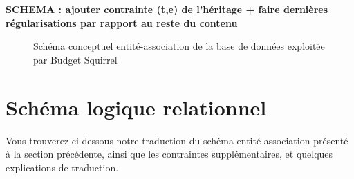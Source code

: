\documentclass[a4paper,12pt]{article}
\begin{document}
\textbf{SCHEMA : ajouter contrainte (t,e) de l'héritage + faire dernières régularisations par rapport au reste du contenu}

\begin{figure}[!ht]
\noindent
{}
\caption{\footnotesize{Schéma conceptuel entité-association de la base de données exploitée par Budget Squirrel}}
\end{figure}

\newpage 

\section{Schéma logique relationnel}

Vous trouverez ci-dessous notre traduction du schéma entité association présenté à la section précédente, ainsi que les contraintes supplémentaires, et quelques explications de traduction.
\end{document}
